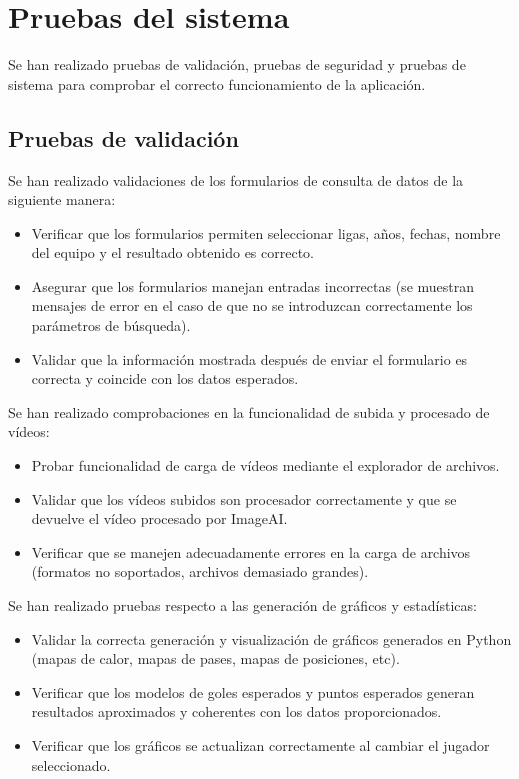 \section{Pruebas del sistema}

Se han realizado pruebas de validación, pruebas de seguridad y pruebas de sistema para comprobar el correcto funcionamiento de la aplicación.

\subsection{Pruebas de validación}
Se han realizado validaciones de los formularios de consulta de datos de la siguiente manera:
\begin{itemize}
    \item Verificar que los formularios permiten seleccionar ligas, años, fechas, nombre del equipo y el resultado obtenido es correcto.
    \item Asegurar que los formularios manejan entradas incorrectas (se muestran mensajes de error en el caso de que no se introduzcan correctamente los parámetros de búsqueda).
    \item Validar que la información mostrada después de enviar el formulario es correcta y coincide con los datos esperados.
\end{itemize}

Se han realizado comprobaciones en la funcionalidad de subida y procesado de vídeos:
\begin{itemize}
    \item Probar funcionalidad de carga de vídeos mediante el explorador de archivos.
    \item Validar que los vídeos subidos son procesador correctamente y que se devuelve el vídeo procesado por ImageAI.
    \item Verificar que se manejen adecuadamente errores en la carga de archivos (formatos no soportados, archivos demasiado grandes).
\end{itemize}

Se han realizado pruebas respecto a las generación de gráficos y estadísticas:
\begin{itemize}
    \item Validar la correcta generación y visualización de gráficos generados en Python (mapas de calor, mapas de pases, mapas de posiciones, etc).
    \item Verificar que los modelos de goles esperados y puntos esperados generan resultados aproximados y coherentes con los datos proporcionados.
    \item Verificar que los gráficos se actualizan correctamente al cambiar el jugador seleccionado.
\end{itemize}

